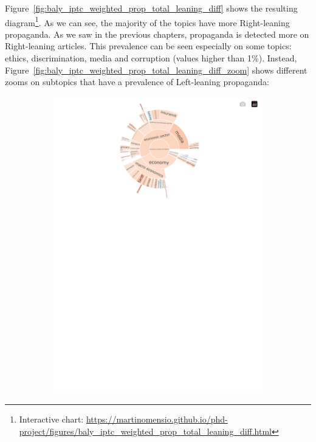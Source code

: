 Figure~\ref{fig:baly_iptc_weighted_prop_total_leaning_diff} shows the resulting diagram\footnote{Interactive chart: \url{https://martinomensio.github.io/phd-project/figures/baly_iptc_weighted_prop_total_leaning_diff.html}}.
As we can see, the majority of the topics have more Right-leaning propaganda. As we saw in the previous chapters, propaganda is detected more on Right-leaning articles.
This prevalence can be seen especially on some topics: ethics, discrimination, media and corruption (values higher than 1\%).
Instead, Figure~\ref{fig:baly_iptc_weighted_prop_total_leaning_diff_zoom} shows different zooms on subtopics that have a prevalence of Left-leaning propaganda:

\begin{figure}[!htbp]
    \centering
	\begin{subfigure}{0.45\textwidth}
		\includegraphics[trim={0 0 0 0},clip,width=\linewidth]{figures/baly_iptc_weighted_prop_total_leaning_diff_zoom_economy.pdf}

\end{subfigure}
\end{figure}
